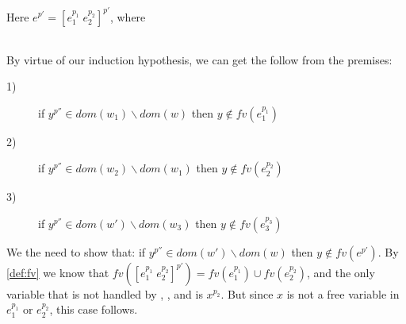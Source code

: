 \item[\runa{App-rec}] Here $e^{p'}=[e_1^{p_1}\;e_2^{p_2}]^{p'}$, where
\begin{figure}[H]
	\setlength\tabcolsep{8pt}
	\begin{tabular}{l}
		
	\end{tabular}
\end{figure}
By virtue of our induction hypothesis, we can get the follow from the premises:
\begin{description}
	\item[1)] if $y^{p''}\in dom(w_1)\backslash dom(w)$ then $y\notin fv(e_1^{p_1})$
	\item[2)] if $y^{p''}\in dom(w_2)\backslash dom(w_1)$ then $y\notin fv(e_2^{p_2})$
	\item[3)] if $y^{p''}\in dom(w')\backslash dom(w_3)$ then $y\notin fv(e_3^{p_3})$
\end{description}
We the need to show that: if $y^{p''}\in dom(w')\backslash dom(w)$ then $y\notin fv(e^{p'})$.
By \cref{def:fv} we know that $fv([e_1^{p_1}\;e_2^{p_2}]^{p'})=fv(e_1^{p_1})\cup fv(e_2^{p_2})$, and the only variable that is not handled by , , and  is $x^{p_2}$.
But since $x$ is not a free variable in $e_1^{p_1}$ or $e_2^{p_2}$, this case follows.
